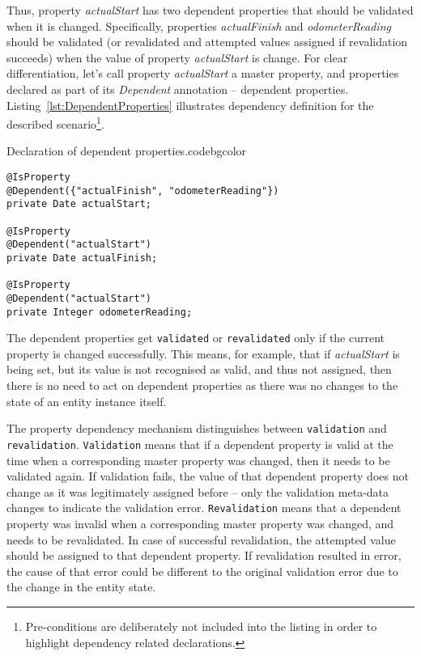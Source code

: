   Thus, property \emph{actualStart} has two dependent properties that should be validated when it is changed.
  Specifically, properties \emph{actualFinish} and \emph{odometerReading} should be validated (or revalidated and attempted values assigned if revalidation succeeds) when the value of property \emph{actualStart} is change.
  For clear differentiation, let's call property \emph{actualStart} a master property, and properties declared as part of its \emph{Dependent} annotation -- dependent properties.
  Listing~\ref{lst:DependentProperties} illustrates dependency definition for the described scenario\footnote{Pre-conditions are deliberately not included into the listing in order to highlight dependency related declarations.}.

  \begin{code}{Declaration of dependent properties.}{\label{lst:DependentProperties}}{codebgcolor}
    \begin{lstlisting}
@IsProperty
@Dependent({"actualFinish", "odometerReading"})
private Date actualStart;

@IsProperty
@Dependent("actualStart")
private Date actualFinish;

@IsProperty
@Dependent("actualStart")
private Integer odometerReading;
    \end{lstlisting}
  \end{code}

  The dependent properties get \texttt{validated} or \texttt{revalidated} only if the current property is changed successfully.
  This means, for example, that if \emph{actualStart} is being set, but its value is not recognised as valid, and thus not assigned, then there is no need to act on dependent properties as there was no changes to the state of an entity instance itself.
  
  The property dependency mechanism distinguishes between \texttt{validation} and \texttt{revalidation}.  
  \texttt{Validation} means that if a dependent property is valid at the time when a corresponding master property was changed, then it needs to be validated again.
  If validation fails, the value of that dependent property does not change as it was legitimately assigned before -- only the validation meta-data changes to indicate the validation error.
  \texttt{Revalidation} means that a dependent property was invalid when a corresponding master property was changed, and needs to be revalidated.
  In case of successful revalidation, the attempted value should be assigned to that dependent property.
  If revalidation resulted in error, the cause of that error could be different to the original validation error due to the change in the entity state.
  
